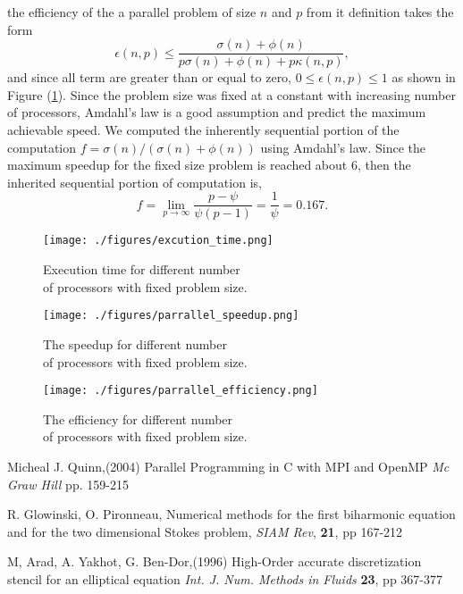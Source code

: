 the efficiency of the a parallel problem of size $n$ and $p$ from it definition takes the form
\begin{equation*}
\epsilon(n,p) \leq \frac{\sigma(n)+\phi(n)}{p\sigma(n) + \phi(n) + p\kappa(n,p)},
\end{equation*}
and since all term are greater than or equal to zero, $0\leq\epsilon(n,p)\leq1$ as shown in Figure (\ref{eff}). Since the problem size was fixed at a constant with increasing number of processors, Amdahl's law is a good assumption and predict the maximum achievable speed.
We computed the inherently sequential portion of the computation $f = \sigma(n)/(\sigma(n) + \phi(n))$  using Amdahl's law. Since the maximum speedup for the fixed size problem is reached about 6, then the inherited sequential portion of computation is,
\begin{equation*}
f =  \lim_{p \to \infty} \frac{p-\psi}{\psi(p-1)} =\frac{1}{\psi} = 0.167.
\end{equation*}

\begin{figure}[t]
\footnotesize
\begin{minipage}[htb]{.5\textwidth}
\texttt{[image: ./figures/excution\_time.png]}
\caption{Execution time for different number \\of processors with fixed problem size. }
\label{time}
\end{minipage}
\begin{minipage}[h]{.5\textwidth}
\texttt{[image: ./figures/parrallel\_speedup.png]}
\caption{The speedup for different number \\of processors with fixed problem size.}
\label{speed}
\end{minipage}
\begin{minipage}[h]{.5\textwidth}
\texttt{[image: ./figures/parrallel\_efficiency.png]}
\caption{The efficiency for different number \\ of processors with fixed problem size.}
\label{eff}
\end{minipage}
\end{figure}

\begin{thebibliography}{9}
Micheal J. Quinn,(2004)
Parallel Programming in C with MPI and OpenMP
\textit{Mc Graw Hill}
pp. 159-215

R. Glowinski, O. Pironneau,
Numerical methods for the first biharmonic equation and for the two dimensional Stokes problem,
\textit{SIAM Rev},
\textbf{21}, pp 167-212

M, Arad, A. Yakhot, G. Ben-Dor,(1996)
High-Order accurate discretization stencil for an elliptical equation 
\textit{Int. J. Num. Methods in Fluids}   
\textbf{23}, pp 367-377
\end{thebibliography}




